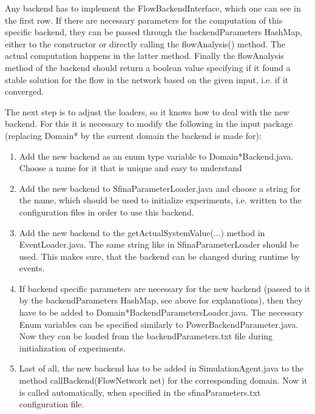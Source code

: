 \documentclass[11pt,fleqn]{book} %
\begin{document}
Any backend has to implement the FlowBackendInterface, which one can see in the first row. If there are necessary parameters for the computation of this specific backend, they can be passed through the backendParameters HashMap, either to the constructor or directly calling the flowAnalysis() method. The actual computation happens in the latter method. Finally the flowAnalysis method of the backend should return a boolean value specifying if it found a stable solution for the flow in the network based on the given input, i.e. if it converged.

The next step is to adjust the loaders, so it knows how to deal with the new backend. For this it is necessary to modify the following in the input package (replacing Domain* by the current domain the backend is made for):
\begin{enumerate}
	\item Add the new backend as an enum type variable to Domain*Backend.java. Choose a name for it that is unique and easy to understand
	\item Add the new backend to SfinaParameterLoader.java and choose a string for the name, which should be used to initialize experiments, i.e. written to the configuration files in order to use this backend.
	\item Add the new backend to the getActualSystemValue(...) method in EventLoader.java. The same string like in SfinaParameterLoader should be used. This makes sure, that the backend can be changed during runtime by events.
	\item If backend specific parameters are necessary for the new backend (passed to it by the backendParameters HashMap, see above for explanations), then they have to be added to Domain*BackendParametersLoader.java. The necessary Enum variables can be specified similarly to PowerBackendParameter.java. Now they can be loaded from the backendParameters.txt file during initialization of experiments.
	\item Last of all, the new backend has to be added in SimulationAgent.java to the method callBackend(FlowNetwork net) for the corresponding domain. Now it is called automatically, when specified in the sfinaParameters.txt configuration file.
\end{enumerate}
\end{document}
